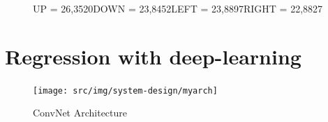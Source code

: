 \begin{figure}[hp]
  \caption{\newline UP = 97,6530\newline DOWN = 100,0000\newline LEFT = 93,8538\newline RIGHT = 92,5261}\label{fig:fb}
\endminipage\hfill
{}%
   \caption{\newline UP = 26,3520\newline DOWN = 23,8452\newline LEFT = 23,8897\newline RIGHT = 22,8827}\label{fig:fc}
 
\endminipage
\end{figure}

\newpage
\section{Regression with deep-learning}


\begin{figure}[h]
	\begin{center}
		\texttt{[image: src/img/system-design/myarch]}
		\caption{ConvNet Architecture} \label{fig:myarch}
    \end{center}
\end{figure}